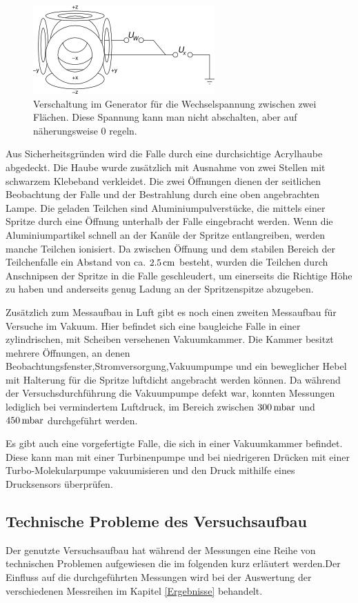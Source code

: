 \documentclass[a4paper,12pt]{article}
\begin{document}
\begin{figure}[htb]
		\centering
		\includegraphics{Schaltbild_Wechselspannung.png}
		\caption{Verschaltung im Generator für die Wechselspannung zwischen zwei Flächen.
			Diese Spannung kann man nicht abschalten, aber auf näherungsweise $0$ regeln.
			\cite{versuchsanleitung}}
		\label{verschaltungres}
\end{figure}

Aus Sicherheitsgründen wird die Falle durch eine durchsichtige Acrylhaube abgedeckt.
Die Haube wurde zusätzlich mit Ausnahme von zwei Stellen mit schwarzem Klebeband verkleidet.
Die zwei Öffnungen dienen der seitlichen Beobachtung der Falle und der Bestrahlung durch eine oben angebrachten Lampe.
Die geladen Teilchen sind Aluminiumpulverstücke, die mittels einer Spritze durch eine Öffnung unterhalb der Falle eingebracht werden.
Wenn die Aluminiumpartikel schnell an der Kanüle der Spritze entlangreiben, werden manche Teilchen ionisiert.
Da zwischen Öffnung und dem stabilen Bereich der Teilchenfalle ein Abstand von ca. $\unit[2.5]{cm}$  besteht,
 wurden die Teilchen durch Anschnipsen der Spritze in die Falle geschleudert, um einerseits die Richtige Höhe zu haben und anderseits genug Ladung an der Spritzenspitze abzugeben.

Zusätzlich zum Messaufbau in Luft gibt es noch einen zweiten Messaufbau für Versuche im Vakuum.
Hier befindet sich eine baugleiche Falle in einer zylindrischen, mit Scheiben versehenen Vakuumkammer.
Die Kammer besitzt mehrere Öffnungen, an denen Beobachtungsfenster,Stromversorgung,Vakuumpumpe und ein beweglicher Hebel mit Halterung für die Spritze luftdicht angebracht werden können.
Da während der Versuchsdurchführung die Vakuumpumpe defekt war,
konnten Messungen lediglich bei vermindertem Luftdruck, im Bereich zwischen $\unit[300]{mbar}$ und $\unit[450]{mbar}$ durchgeführt werden.

Es gibt auch eine vorgefertigte Falle, die sich in einer Vakuumkammer befindet.
Diese kann man mit einer Turbinenpumpe und bei niedrigeren Drücken mit einer Turbo-Molekularpumpe vakuumisieren und den Druck mithilfe eines Drucksensors überprüfen.

\subsection{Technische Probleme des Versuchsaufbau}
Der genutzte Versuchsaufbau hat während der Messungen eine Reihe von technischen Problemen aufgewiesen die im folgenden kurz erläutert werden.Der Einfluss
auf die durchgeführten Messungen wird bei der Auswertung der verschiedenen Messreihen im Kapitel \ref{Ergebnisse} behandelt.
\end{document}
